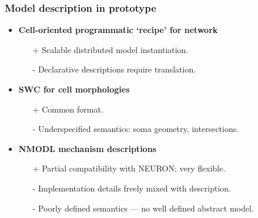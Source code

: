 \documentclass[aspectratio=43,12pt]{beamer}
\begin{document}
\begin{frame}
\frametitle{Model description in prototype}
\vfill
\begin{itemize}
\item \textbf{Cell-oriented programmatic `recipe' for network}
\begin{itemize}
\item[+] Scalable distributed model instantiation.
\item[-] Declarative descriptions require translation. 
\end{itemize}
\item \textbf{SWC for cell morphologies}
\begin{itemize}
\item[+] Common format.
\item[-] Underspecified semantics: soma geometry, intersections.
\end{itemize}
\item \textbf{NMODL mechanism descriptions}
\begin{itemize}
\item[+] Partial compatibility with NEURON; very flexible.
\item[-] Implementation details freely mixed with description.
\item[-] Poorly defined semantics --- no well defined abstract model.
\end{itemize}
\end{itemize}
\vfill
\end{frame}
\end{document}
